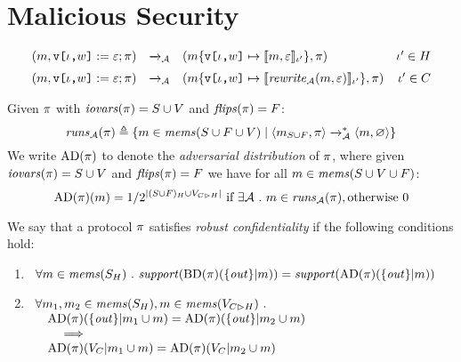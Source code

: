 \section{Malicious Security}

\newcommand{\adversary}{\mathcal{A}}
\newcommand{\aredx}{\redx_{\adversary}}
\newcommand{\aredxs}{\redxs_{\adversary}}
\newcommand{\arewrite}{\mathit{rewrite}_{\adversary}}
\newcommand{\cinputs}{V_{C \rhd H}}
\newcommand{\aruns}{\mathit{runs}_\adversary}
\newcommand{\att}{\mathrm{AD}}
\newcommand{\support}{\mathit{support}}

$$
\begin{array}{rclr}
  (\store, \eassign{\view{\cid}{w}}{\be};\prog) &\aredx&
    (\extend{\store}{\view{\cid}{w}}{\lcod{\store,\be}{\cid'}}, \prog) &\cid' \in H\\[2mm]
  (\store, \eassign{\view{\cid}{w}}{\be};\prog) &\aredx&
    (\extend{\store}{\view{\cid}{w}}{\lcod{\arewrite(\store,\be)}{\cid'}}, \prog) &\cid' \in C
\end{array}
$$

\begin{definition}
  Given $\pi$ with $\mathit{iovars}(\pi) = S \cup V$ and $\mathit{flips}(\pi) = F$:
  $$
  \aruns(\prog) \defeq \{ \store \in \mems(S\cup F \cup V) \mid \config{\store_{S \cup F}}{\prog} \aredxs \config{\store}{\varnothing} \}
  $$
  We write $\att(\prog)$ to denote the \emph{adversarial distribution} of
  $\pi$, where given $\mathit{iovars}(\pi) = S \cup V$ and $\mathit{flips}(\pi) = F$
  we have for all $m \in \mathit{mems}(S \cup V \cup F)$:
  $$
  \att(\prog)(\store) =  1 / 2^{|(S\cup F)_H \cup \cinputs|} \ \text{if}\ \exists \adversary\ .\ \store \in \aruns(\prog), \text{otherwise}\ 0
  $$
\end{definition}

\begin{definition}
  We say that a protocol $\pi$ satisfies \emph{robust confidentiality} if the following conditions hold:
  \begin{enumerate}
  \item $\ \,\forall \store \in \mems(S_H) \ .\ \support(\progtt(\prog)(\{ \outv \}|m)) = \support(\att(\prog)(\{ \outv \}|m))$
  \item $\begin{array}[t]{l}\forall m_1, m_2 \in \mems(S_H), m \in \mems(\cinputs)\ . \\
    \quad \att(\prog)(\{ \outv \} |m_1 \cup m) = \att(\prog)(\{ \outv \}|m_2 \cup m) \\
    \qquad \implies\\
    \quad \att(\prog)(V_C|m_1 \cup m) = \att(\prog)(V_C|m_2 \cup m)\end{array}$
  \end{enumerate}
\end{definition}


